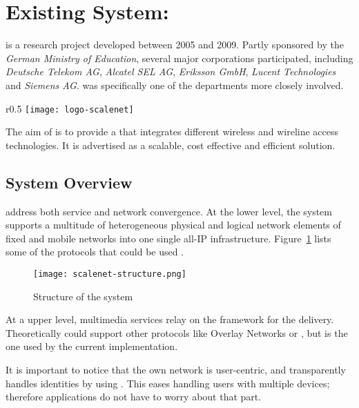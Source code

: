 \section{Existing System: } %
\label{sec:scalenet}

 \cite{SIE06} is a research project developed between 2005 and 2009.
Partly sponsored by the \emph{German Ministry of Education}, several major corporations participated, including \emph{Deutsche Telekom AG}, \emph{Alcatel SEL AG}, \emph{Eriksson GmbH}, \emph{Lucent Technologies} and \emph{Siemens AG}.
 was specifically one of the departments more closely involved.

\begin{wrapfigure}{r}{0.5\textwidth}
  \centering
    \texttt{[image: logo-scalenet]}
  \caption{ logo}
  \label{fig:logo-scalenet}
\end{wrapfigure}

The aim of  is to provide a  that integrates different wireless and wireline access technologies.
It is advertised as a scalable, cost effective and efficient  solution.

\subsection{System Overview} %
\label{sub:overviewscalenet}

 address both service and network convergence.
At the lower level, the system supports a multitude of heterogeneous physical and logical network elements of fixed and mobile networks into one single all-IP infrastructure.
Figure~\ref{fig:scalenet-structure} lists some of the protocols that could be used \cite{SIV08}.

\begin{figure}[htbp]
  \centering
    \texttt{[image: scalenet-structure.png]}
  \caption{Structure of the system}
  \label{fig:scalenet-structure}
\end{figure}

At a upper level, multimedia services relay on the  framework for the delivery.
Theoretically  could support other protocols like Overlay Networks or , but  is the one used by the current implementation.

It is important to notice that the own network is user-centric, and transparently handles identities by using .
This eases handling users with multiple devices; therefore applications do not have to worry about that part.

